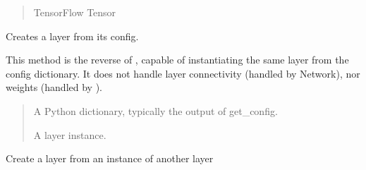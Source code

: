 \documentclass[letterpaper,10pt,english]{sphinxmanual}
\begin{document}
\begin{fulllineitems}
\begin{fulllineitems}
\begin{quote}
\begin{description}
\sphinxAtStartPar
TensorFlow Tensor

\end{description}\end{quote}

\end{fulllineitems}


\begin{fulllineitems}
\label{\detokenize{beyondml.tflow.layers:beyondml.tflow.layers.SparseDense.SparseDense.from_config}}
\pysigstartsignatures
{}
\pysigstopsignatures
\sphinxAtStartPar
Creates a layer from its config.

\sphinxAtStartPar
This method is the reverse of ,
capable of instantiating the same layer from the config
dictionary. It does not handle layer connectivity
(handled by Network), nor weights (handled by ).
\begin{quote}\begin{description}
\sphinxAtStartPar
{} \textendash{} A Python dictionary, typically the
output of get\_config.

\sphinxAtStartPar
A layer instance.

\end{description}\end{quote}

\end{fulllineitems}


\begin{fulllineitems}
\label{\detokenize{beyondml.tflow.layers:beyondml.tflow.layers.SparseDense.SparseDense.from_layer}}
\pysigstartsignatures
{}
\pysigstopsignatures
\sphinxAtStartPar
Create a layer from an instance of another layer


\end{fulllineitems}
\end{fulllineitems}
\end{document}
